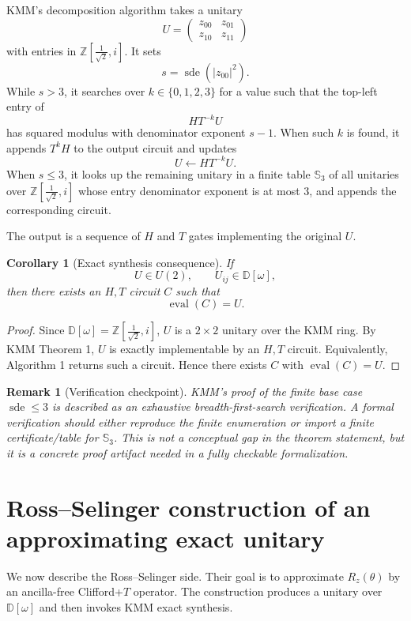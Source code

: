 \documentclass[11pt]{article}
\newtheorem{corollary}[theorem]{Corollary}
\newtheorem{remark}[theorem]{Remark}
\newcommand{\Dw}{\mathbb D[\omega]}
\newcommand{\Rring}{\mathbb Z\left[\frac{1}{\sqrt 2},i\right]}
\newcommand{\mat}[1]{\begin{pmatrix}#1\end{pmatrix}}
\begin{document}
KMM's decomposition algorithm takes a unitary
\[
  U=\mat{z_{00}&z_{01}\\z_{10}&z_{11}}
\]
with entries in $\Rring$. It sets
\[
  s=\operatorname{sde}(|z_{00}|^2).
\]
While $s>3$, it searches over $k\in\{0,1,2,3\}$ for a value such that the top-left entry of
\[
  HT^{-k}U
\]
has squared modulus with denominator exponent $s-1$. When such $k$ is found, it appends $T^kH$ to the output circuit and updates
\[
  U\leftarrow HT^{-k}U.
\]
When $s\le3$, it looks up the remaining unitary in a finite table $\mathbb S_3$ of all unitaries over $\Rring$ whose entry denominator exponent is at most $3$, and appends the corresponding circuit.

The output is a sequence of $H$ and $T$ gates implementing the original $U$.

\begin{corollary}[Exact synthesis consequence]
If
\[
  U\in U(2),\qquad U_{ij}\in\Dw,
\]
then there exists an $H,T$ circuit $C$ such that
\[
  \operatorname{eval}(C)=U.
\]
\end{corollary}

\begin{proof}
Since $\Dw=\Rring$, $U$ is a $2\times2$ unitary over the KMM ring. By KMM Theorem 1, $U$ is exactly implementable by an $H,T$ circuit. Equivalently, Algorithm 1 returns such a circuit. Hence there exists $C$ with $\operatorname{eval}(C)=U$.
\end{proof}

\begin{remark}[Verification checkpoint]
KMM's proof of the finite base case $\operatorname{sde}\le3$ is described as an exhaustive breadth-first-search verification. A formal verification should either reproduce the finite enumeration or import a finite certificate/table for $\mathbb S_3$. This is not a conceptual gap in the theorem statement, but it is a concrete proof artifact needed in a fully checkable formalization.
\end{remark}

\section{Ross--Selinger construction of an approximating exact unitary}

We now describe the Ross--Selinger side. Their goal is to approximate $R_z(\theta)$ by an ancilla-free Clifford+$T$ operator. The construction produces a unitary over $\Dw$ and then invokes KMM exact synthesis.
\end{document}
